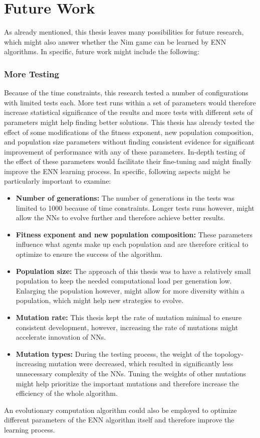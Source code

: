 \section{Future Work}\label{sec:future-work}
As already mentioned, this thesis leaves many possibilities for future research, which might also answer whether the Nim game can be learned by ENN algorithms.
In specific, future work might include the following:

\subsubsection{More Testing}
Because of the time constraints, this research tested a number of configurations with limited tests each.
More test runs within a set of parameters would therefore increase statistical significance of the results and more tests with different sets of parameters might help finding better solutions.
This thesis has already tested the effect of some modifications of the fitness exponent, new population composition, and population size parameters without finding consistent evidence for significant improvement of performance with any of these parameters.
In-depth testing of the effect of these parameters would facilitate their fine-tuning and might finally improve the ENN learning process.
In specific, following aspects might be particularly important to examine:
\begin{itemize}
    \item \textbf{Number of generations:} The number of generations in the tests was limited to 1000 because of time constraints.
    Longer tests runs however, might allow the NNs to evolve further and therefore achieve better results.
    \item \textbf{Fitness exponent and new population composition:} These parameters influence what agents make up each population and are therefore critical to optimize to ensure the success of the algorithm.
    \item \textbf{Population size:} The approach of this thesis was to have a relatively small population to keep the needed computational load per generation low.
    Enlarging the population however, might allow for more diversity within a population, which might help new strategies to evolve.
    \item \textbf{Mutation rate:} This thesis kept the rate of mutation minimal to ensure consistent development, however, increasing the rate of mutations might accelerate innovation of NNs.
    \item \textbf{Mutation types:} During the testing process, the weight of the topology-increasing mutation were decreased, which resulted in significantly less unnecessary complexity of the NNs.
    Tuning the weights of other mutations might help prioritize the important mutations and therefore increase the efficiency of the whole algorithm.
\end{itemize}
An evolutionary computation algorithm could also be employed to optimize different parameters of the ENN algorithm itself and therefore improve the learning process.

